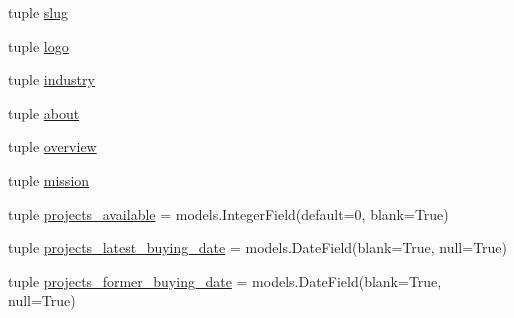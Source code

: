 \begin{DoxyCompactItemize}
\item 
tuple \hyperlink{classcompanies_1_1models_1_1_company_a03bc52deb463d3a7072deabf847daa60}{slug}
\item 
tuple \hyperlink{classcompanies_1_1models_1_1_company_ada3f2e6d1915bde99447fee8537220b7}{logo}
\item 
tuple \hyperlink{classcompanies_1_1models_1_1_company_aeeb566248f7aebaa72999f8ebd2ea3c0}{industry}
\item 
tuple \hyperlink{classcompanies_1_1models_1_1_company_ab12d8c270126084d94ff00f7e4df9158}{about}
\item 
tuple \hyperlink{classcompanies_1_1models_1_1_company_ae4e99a8aab4627625925eec5018d5821}{overview}
\item 
tuple \hyperlink{classcompanies_1_1models_1_1_company_a4ac1beb5cc78ea8bc75f8b81132c8afd}{mission}
\item 
tuple \hyperlink{classcompanies_1_1models_1_1_company_a4f434779b857f4d1cd0e9b9f67d950be}{projects\-\_\-available} = models.\-Integer\-Field(default=0, blank=True)
\item 
tuple \hyperlink{classcompanies_1_1models_1_1_company_a8c9f48d88310960c158105bce0667e05}{projects\-\_\-latest\-\_\-buying\-\_\-date} = models.\-Date\-Field(blank=True, null=True)
\item 
tuple \hyperlink{classcompanies_1_1models_1_1_company_a9b047e236e4419f31a944f8dee44948b}{projects\-\_\-former\-\_\-buying\-\_\-date} = models.\-Date\-Field(blank=True, null=True)
\end{DoxyCompactItemize}


